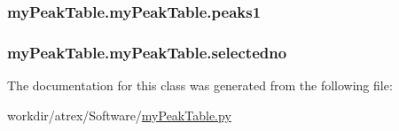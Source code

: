 \hypertarget{classmy_peak_table_1_1my_peak_table_ac746b90e0b88d62891770a0c82a6366c}{
\subsubsection[{peaks1}]{\setlength{\rightskip}{0pt plus 5cm}my\-Peak\-Table.\-my\-Peak\-Table.\-peaks1}}\label{classmy_peak_table_1_1my_peak_table_ac746b90e0b88d62891770a0c82a6366c}
\hypertarget{classmy_peak_table_1_1my_peak_table_aa7213ccc67f2d998076ef95396d53d01}{
\subsubsection[{selectedno}]{\setlength{\rightskip}{0pt plus 5cm}my\-Peak\-Table.\-my\-Peak\-Table.\-selectedno}}\label{classmy_peak_table_1_1my_peak_table_aa7213ccc67f2d998076ef95396d53d01}


The documentation for this class was generated from the following file\-:\begin{DoxyCompactItemize}
\item 
workdir/atrex/\-Software/\hyperlink{my_peak_table_8py}{my\-Peak\-Table.\-py}\end{DoxyCompactItemize}
